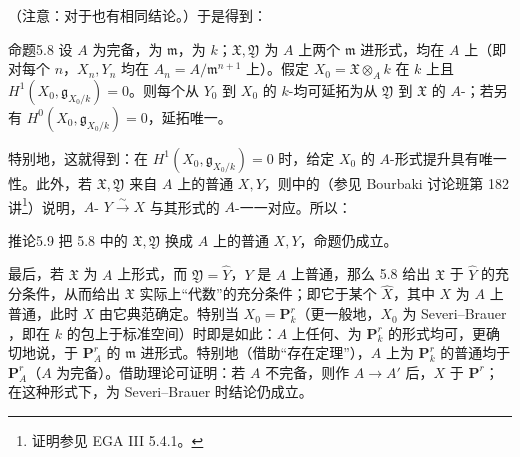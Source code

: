 （注意：对于也有相同结论。）于是得到：
\begin{SGAresult}{命题}{5.8}
设 $A$ 为完备，为 $\mathfrak m$，为 $k$；$\mathfrak X,\mathfrak Y$ 为 $A$ 上两个 $\mathfrak m$ 进形式，均在 $A$ 上（即对每个 $n$，$X_n,Y_n$ 均在 $A_n=A/\mathfrak m^{n+1}$ 上）。假定 $X_0=\mathfrak X\otimes_A k$ 在 $k$ 上且 $H^1(X_0,\mathfrak g_{X_0/k})=0$。则每个从 $Y_0$ 到 $X_0$ 的 $k$-均可延拓为从 $\mathfrak Y$ 到 $\mathfrak X$ 的 $A$-；若另有 $H^0(X_0,\mathfrak g_{X_0/k})=0$，延拓唯一。
\end{SGAresult}
特别地，这就得到：在 $H^1(X_0,\mathfrak g_{X_0/k})=0$ 时，给定 $X_0$ 的 $A$-形式提升具有唯一性。此外，若 $\mathfrak X,\mathfrak Y$ 来自 $A$ 上的普通 $X,Y$，则中的（参见 Bourbaki 讨论班第 182 讲\footnote{证明参见 EGA III 5.4.1。}）说明，$A$- $Y\xrightarrow{\sim}X$ 与其形式的 $A$-一一对应。所以：
\begin{SGAresult}{推论}{5.9}
把 5.8 中的 $\mathfrak X,\mathfrak Y$ 换成 $A$ 上的普通 $X,Y$，命题仍成立。
\end{SGAresult}
最后，若 $\mathfrak X$ 为 $A$ 上形式，而 $\mathfrak Y=\widehat Y$，$Y$ 是 $A$ 上普通，那么 5.8 给出 $\mathfrak X$ 于 $\widehat Y$ 的充分条件，从而给出 $\mathfrak X$ 实际上“代数”的充分条件；即它于某个 $\widehat X$，其中 $X$ 为 $A$ 上普通，此时 $X$ 由它典范确定。特别当 $X_0=\mathbf P^r_k$（更一般地，$X_0$ 为 Severi--Brauer ，即在 $k$ 的包上于标准空间）时即是如此：$A$ 上任何、为 $\mathbf P^r_k$ 的形式均可，更确切地说，于 $\mathbf P^r_A$ 的 $\mathfrak m$ 进形式。特别地（借助“存在定理”），$A$ 上为 $\mathbf P^r_k$ 的普通均于 $\mathbf P^r_A$（$A$ 为完备）。借助理论可证明：若 $A$ 不完备，则作 $A\to A'$ 后，$X$ 于 $\mathbf P^r$；在这种形式下，为 Severi--Brauer 时结论仍成立。

